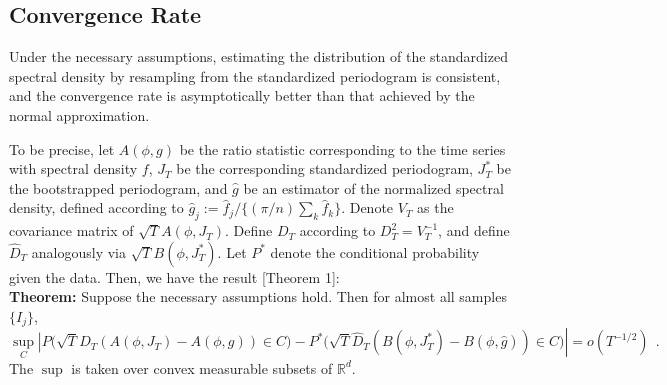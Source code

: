 \subsection*{Convergence Rate}

Under the necessary assumptions, estimating the distribution of the standardized spectral density by resampling from the standardized periodogram is consistent, and the convergence rate is asymptotically better than that achieved by the normal approximation. 

To be precise, let $A(\phi,g)$ be the ratio statistic corresponding to the time series with spectral density $f$, $J_T$ be the corresponding standardized periodogram, $J_T^*$ be the bootstrapped periodogram, and $\hat g$ be an estimator of the normalized spectral density, defined according to $\hat g_j := \hat f_j / \{(\pi/n) \sum_k \hat f_k\}$. Denote $V_T$ as the covariance matrix of $\sqrt T A(\phi,J_T)$. Define $D_T$ according to $D_T^2 = V_T^{-1}$, and define $\hat D_T$ analogously via $\sqrt T B(\phi,J_T^*)$. Let $P^*$ denote the conditional probability given the data. Then, we have the result \cite{bootstrap}[Theorem 1]:\\

\textbf{Theorem:}
Suppose the necessary assumptions hold. Then for almost all samples $\{I_j\}$, 
$$
\sup_C \left| P\bigl( \sqrt T D_T(A(\phi,J_T) - A(\phi,g)) \in C \bigr) \right. - \left. P^*\bigl(\sqrt T \hat D_T(B(\phi,J_T^*)-B(\phi,\hat g)) \in C  \bigr)\right| = o(T^{-1/2})~~.
$$
The $\sup$ is taken over convex measurable subsets of $\mathbb R^d$.